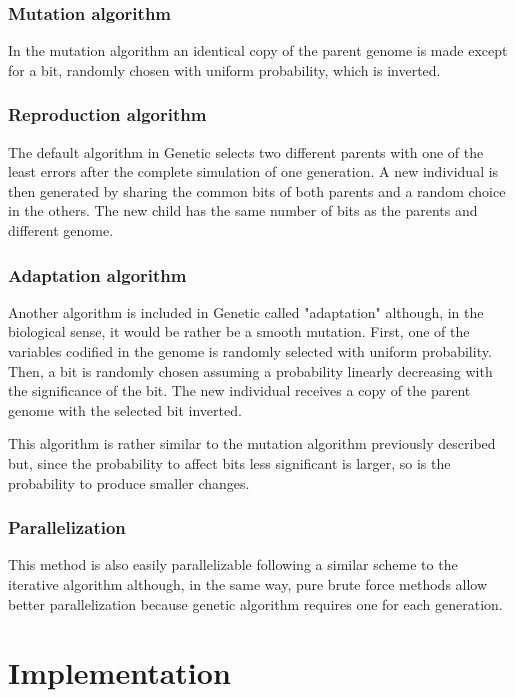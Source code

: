 \documentclass[review,authoryear]{elsarticle}
\begin{document}
\subsubsection{Mutation algorithm}

In the mutation algorithm an identical copy of the parent genome is made except for a bit, randomly chosen with uniform probability, which is inverted.

\subsubsection{Reproduction algorithm}

The default algorithm in Genetic selects two different parents with one of the least errors after the 
complete simulation of one generation. 
A new individual is then generated by sharing the common bits of both parents and a random choice in the others.
The new child has the same number of bits as the parents and different genome.

\subsubsection{Adaptation algorithm}

Another algorithm is included in Genetic called "adaptation" although, in the
biological sense, it would be rather be a smooth mutation. First, one of the
variables codified in the genome is randomly selected with uniform probability.
Then, a bit is randomly chosen assuming a probability linearly decreasing with
the significance of the bit. The new individual receives a copy of the parent
genome with the selected bit inverted.

This algorithm is rather similar to the mutation algorithm previously described but, since the probability to affect bits less significant is larger, so is the probability to produce smaller changes.

\subsubsection{Parallelization}

This method is also easily parallelizable following a similar scheme to the
iterative algorithm although, in the same way, pure brute force methods allow
better parallelization because genetic algorithm requires one for each
generation.

\section{Implementation}
\end{document}
